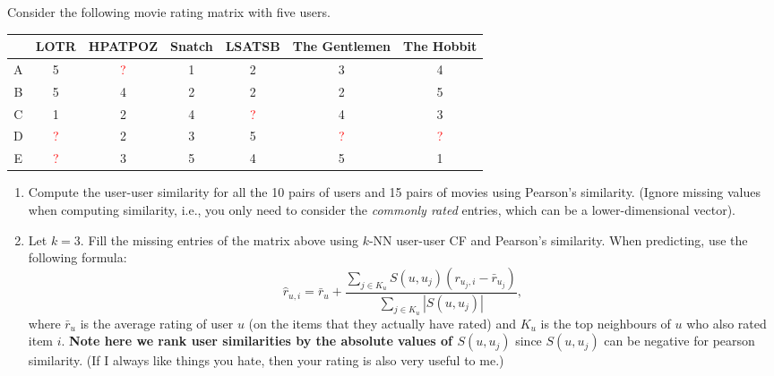 \documentclass[11pt]{article}
\newenvironment{problem}[2][Problem]{\begin{trivlist}
\item[\hskip \labelsep {\bfseries #1}\hskip \labelsep {\bfseries #2.}]}{\end{trivlist}}
\begin{document}
\begin{problem}{1 (30 points)}
Consider the following movie rating matrix with five users. 

\begin{center}
  \begin{tabular}{ |c |c | c | c | c | c | c| }
    \hline
       & LOTR  & HPATPOZ & Snatch & LSATSB & The Gentlemen & The Hobbit \\ \hline
     A & 5&  \textcolor{red}{?} & 1 & 2 & 3 & 4 \\ \hline            
     B & 5&  4 & 2 & 2 & 2 & 5 \\ \hline 
     C & 1 & 2 & 4 & \textcolor{red}{?} & 4 & 3\\ \hline 
     D & \textcolor{red}{?} & 2 & 3 & 5 & \textcolor{red}{?} &\textcolor{red}{?}\\ \hline 
     E & \textcolor{red}{?} & 3 & 5 & 4 & 5 & 1\\ \hline 
  \end{tabular}
\end{center}

\begin{enumerate}
\item 
Compute the user-user similarity for all the 10 pairs of users and 15 pairs of movies using Pearson's similarity. (Ignore missing values when computing similarity, i.e., you only need to consider the \emph{commonly rated} entries, which can be a lower-dimensional vector).
\item
Let $k=3$. Fill the missing entries of the matrix above using $k$-NN user-user CF and Pearson's similarity. When predicting, use the following formula:
\[
	\hat{r}_{u,i} = \bar{r}_u + \frac{\sum_{j \in K_u} S(u, u_j) (r_{u_j,i} - \bar{r}_{u_j})}{\sum_{j \in K_u} |S(u, u_j)| },
\]
where $\bar{r}_u$ is the average rating of user $u$ (on the items that they actually have rated) and $K_u$ is the top neighbours of $u$ who also rated item $i$. \textbf{Note here we rank user similarities by the absolute values of $S(u, u_j)$} since $S(u, u_j)$ can be negative for pearson similarity. (If I always like things you hate, then your rating is also very useful to me.) 
%
\end{enumerate}
\end{problem}
\end{document}
